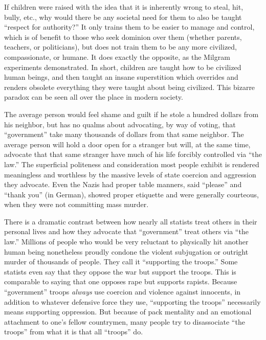 \documentclass{book}
\begin{document}
If children were raised with the idea that it is inherently wrong to steal, hit, bully, etc., why would there be any societal need for them to also be taught \enquote{respect for authority?} It only trains them to be easier to manage and control, which is of benefit to those who seek dominion over them (whether parents, teachers, or politicians), but does not train them to be any more civilized, compassionate, or humane. It does exactly the opposite, as the Milgram experiments demonstrated. In short, children are taught how to be civilized human beings, and then taught an insane superstition which overrides and renders obsolete everything they were taught about being civilized. This bizarre paradox can be seen all over the place in modern society.

The average person would feel shame and guilt if he stole a hundred dollars from his neighbor, but has no qualms about advocating, by way of voting, that \enquote{government} take many thousands of dollars from that same neighbor. The average person will hold a door open for a stranger but will, at the same time, advocate that that same stranger have much of his life forcibly controlled via \enquote{the law.} The superficial politeness and consideration most people exhibit is rendered meaningless and worthless by the massive levels of state coercion and aggression they advocate. Even the Nazis had proper table manners, said \enquote{please} and \enquote{thank you} (in German), showed proper etiquette and were generally courteous, when they were not committing mass murder.

There is a dramatic contrast between how nearly all statists treat others in their personal lives and how they advocate that \enquote{government} treat others via \enquote{the law.} Millions of people who would be very reluctant to physically hit another human being nonetheless proudly condone the violent subjugation or outright murder of thousands of people. They call it \enquote{supporting the troops.} Some statists even say that they oppose the war but support the troops. This is comparable to saying that one opposes rape but supports rapists. Because \enquote{government} troops \emph{always} use coercion and violence against innocents, in addition to whatever defensive force they use, \enquote{supporting the troops} necessarily means supporting oppression. But because of pack mentality and an emotional attachment to one's fellow countrymen, many people try to disassociate \enquote{the troops} from what it is that all \enquote{troops} do.
\end{document}
